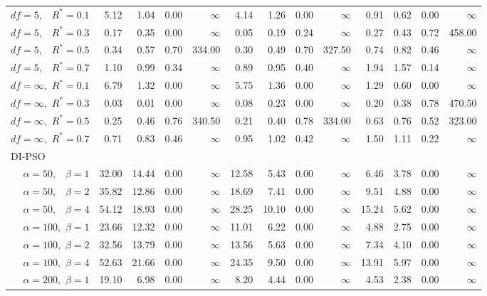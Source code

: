 \documentclass[12pt]{article}
\begin{document}
\begin{table}[ht]
{\begin{tabular}{r|rrrr|rrrr|rrrr}
  $df = 5,\enspace$ $R^* =0.1$ & 5.12 & 1.04 & 0.00 & $\infty$ & 4.14 & 1.26 & 0.00 & $\infty$ & 0.91 & 0.62 & 0.00 & $\infty$ \\ 
  $df = 5,\enspace$ $R^* =0.3$ & 0.17 & 0.35 & 0.00 & $\infty$ & 0.05 & 0.19 & 0.24 & $\infty$ & 0.27 & 0.43 & 0.72 & 458.00 \\ 
  $df = 5,\enspace$ $R^* =0.5$ & 0.34 & 0.57 & 0.70 & 334.00 & 0.30 & 0.49 & 0.70 & 327.50 & 0.74 & 0.82 & 0.46 & $\infty$ \\ 
  $df = 5,\enspace$ $R^* =0.7$ & 1.10 & 0.99 & 0.34 & $\infty$ & 0.89 & 0.95 & 0.40 & $\infty$ & 1.94 & 1.57 & 0.14 & $\infty$ \\ 
  $df = \infty,$ $R^* =0.1$ & 6.79 & 1.32 & 0.00 & $\infty$ & 5.75 & 1.36 & 0.00 & $\infty$ & 1.29 & 0.60 & 0.00 & $\infty$ \\ 
  $df = \infty,$ $R^* =0.3$ & 0.03 & 0.01 & 0.00 & $\infty$ & 0.08 & 0.23 & 0.00 & $\infty$ & 0.20 & 0.38 & 0.78 & 470.50 \\ 
  $df = \infty,$ $R^* =0.5$ & 0.25 & 0.46 & 0.76 & 340.50 & 0.21 & 0.40 & 0.78 & 334.00 & 0.63 & 0.76 & 0.52 & 323.00 \\ 
  $df = \infty,$ $R^* =0.7$ & 0.71 & 0.83 & 0.46 & $\infty$ & 0.95 & 1.02 & 0.42 & $\infty$ & 1.50 & 1.11 & 0.22 & $\infty$ \\ 
\hline
\multicolumn{1}{l|}{DI-PSO} &&&&&&&&&&&&\\
  $\alpha = 50,\enspace$ $\beta =1$ & 32.00 & 14.44 & 0.00 & $\infty$ & 12.58 & 5.43 & 0.00 & $\infty$ & 6.46 & 3.78 & 0.00 & $\infty$ \\ 
  $\alpha = 50,\enspace$ $\beta =2$ & 35.82 & 12.86 & 0.00 & $\infty$ & 18.69 & 7.41 & 0.00 & $\infty$ & 9.51 & 4.88 & 0.00 & $\infty$ \\ 
  $\alpha = 50,\enspace$ $\beta =4$ & 54.12 & 18.93 & 0.00 & $\infty$ & 28.25 & 10.10 & 0.00 & $\infty$ & 15.24 & 5.62 & 0.00 & $\infty$ \\ 
  $\alpha = 100,$ $\beta =1$ & 23.66 & 12.32 & 0.00 & $\infty$ & 11.01 & 6.22 & 0.00 & $\infty$ & 4.88 & 2.75 & 0.00 & $\infty$ \\ 
  $\alpha = 100,$ $\beta =2$ & 32.56 & 13.79 & 0.00 & $\infty$ & 13.56 & 5.63 & 0.00 & $\infty$ & 7.34 & 4.10 & 0.00 & $\infty$ \\ 
  $\alpha = 100,$ $\beta =4$ & 52.63 & 21.66 & 0.00 & $\infty$ & 24.35 & 9.50 & 0.00 & $\infty$ & 13.91 & 5.97 & 0.00 & $\infty$ \\ 
  $\alpha = 200,$ $\beta =1$ & 19.10 & 6.98 & 0.00 & $\infty$ & 8.20 & 4.44 & 0.00 & $\infty$ & 4.53 & 2.38 & 0.00 & $\infty$ \\ 

\end{tabular}}
\end{table}
\end{document}
